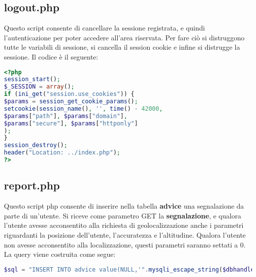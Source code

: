 \subsection{logout.php}
Questo script consente di cancellare la sessione registrata, e quindi l'autenticazione per poter accedere all'area riservata. \newline
Per fare ciò si distruggono tutte le variabili di sessione, si cancella il session cookie e infine si distrugge la sessione. \newline
Il codice è il seguente:
\begin{lstlisting}[language=PHP]
<?php
session_start();
$_SESSION = array();
if (ini_get("session.use_cookies")) {
$params = session_get_cookie_params();
setcookie(session_name(), '', time() - 42000,
$params["path"], $params["domain"],
$params["secure"], $params["httponly"]
);
}
session_destroy();
header("Location: ../index.php"); 
?>
\end{lstlisting}

\subsection{report.php}
Questo script php consente di inserire nella tabella \textbf{advice} una segnalazione da parte di un'utente. \newline Si riceve come parametro GET la \textbf{segnalazione}, e qualora l'utente avesse acconsentito alla richiesta di geolocalizzazione anche i parametri riguardanti la posizione dell'utente, l'accuratezza e l'altitudine. Qualora l'utente non avesse acconsentito alla localizzazione, questi parametri saranno settati a 0. \newline
La query viene costruita come segue:
\begin{lstlisting}[language=PHP]
$sql = "INSERT INTO advice value(NULL,'".mysqli_escape_string($dbhandle,$text)."','".mysqli_escape_string($dbhandle,user_agent())."','".get_time()."','".get_client_ip()."','".$user_pos_time."','".$user_pos_accuracy."','".$user_pos_altitude."','".$user_pos."');";
\end{lstlisting}

